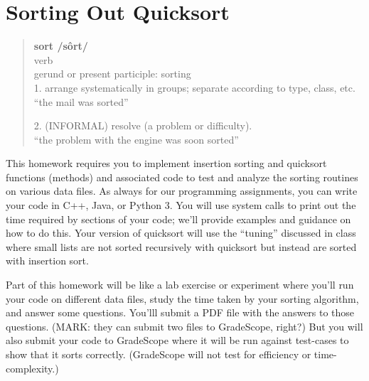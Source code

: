 \documentclass[11pt]{article}
\begin{document}
\section*{Sorting Out Quicksort}



\begin{quote}
\textbf{sort  /sôrt/ }\\
verb \\
gerund or present participle: sorting \\
1. arrange systematically in groups; separate according to type, class, etc. \\
``the mail was sorted''

2. (INFORMAL) resolve (a problem or difficulty). \\
``the problem with the engine was soon sorted''
\end{quote}

This homework requires you to implement insertion sorting and quicksort functions (methods) and associated code to test and analyze the sorting routines on various data files. As always for our programming assignments, you can write your code in C++, Java, or Python 3. You will use system calls to print out the time required by sections of your code; we'll provide examples and guidance on how to do this.  Your version of quicksort will use the ``tuning'' discussed in class where small lists are not sorted recursively with quicksort but instead are sorted with insertion sort.

Part of this homework will be like a lab exercise or experiment where you'll run your code on different data files, study the time taken by your sorting algorithm, and answer some questions.  You'lll submit a PDF file with the answers to those questions.  (MARK:  they can submit two files to GradeScope, right?)  But you will also submit your code to GradeScope where it will be run against test-cases to show that it sorts correctly.  (GradeScope will not test for efficiency or time-complexity.)
\end{document}
